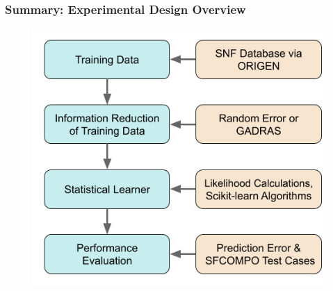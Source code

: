 
\begin{frame}
  \frametitle{Summary: Experimental Design Overview}
  \begin{figure}
    \centering
    \includegraphics[height=0.85\textheight]{./figures/methodology.png}
  \end{figure}
\end{frame}

